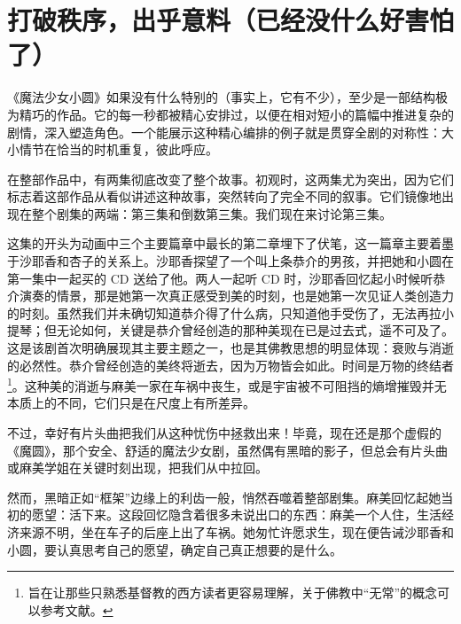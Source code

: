 \chapter[打破秩序，出乎意料（已经没什么好害怕了）]{打破秩序，出乎意料\protect\footnotemark（已经没什么好害怕了）}


《魔法少女小圆》如果没有什么特别的（事实上，它有不少），至少是一部结构极为精巧的作品。它的每一秒都被精心安排过，以便在相对短小的篇幅中推进复杂的剧情，深入塑造角色。一个能展示这种精心编排的例子就是贯穿全剧的对称性：大小情节在恰当的时机重复，彼此呼应。

在整部作品中，有两集彻底改变了整个故事。初观时，这两集尤为突出，因为它们标志着这部作品从看似讲述这种故事，突然转向了完全不同的叙事。它们镜像地出现在整个剧集的两端：第三集和倒数第三集。我们现在来讨论第三集。

这集的开头为动画中三个主要篇章中最长的第二章埋下了伏笔，这一篇章主要着墨于沙耶香和杏子的关系上。沙耶香探望了一个叫上条恭介的男孩，并把她和小圆在第一集中一起买的 CD 送给了他。两人一起听 CD 时，沙耶香回忆起小时候听恭介演奏的情景，那是她第一次真正感受到美的时刻，也是她第一次见证人类创造力的时刻。虽然我们并未确切知道恭介得了什么病，只知道他手受伤了，无法再拉小提琴；但无论如何，关键是恭介曾经创造的那种美现在已是过去式，遥不可及了。这是该剧首次明确展现其主要主题之一，也是其佛教思想的明显体现：衰败与消逝的必然性。恭介曾经创造的美终将逝去，因为万物皆会如此。时间是万物的终结者\footnote{旨在让那些只熟悉基督教的西方读者更容易理解，关于佛教中“无常”的概念可以参考文献\cite{ref25}。}。这种美的消逝与麻美一家在车祸中丧生，或是宇宙被不可阻挡的熵增摧毁并无本质上的不同，它们只是在尺度上有所差异。

不过，幸好有片头曲把我们从这种忧伤中拯救出来！毕竟，现在还是那个虚假的《魔圆》，那个安全、舒适的魔法少女剧，虽然偶有黑暗的影子，但总会有片头曲或麻美学姐在关键时刻出现，把我们从中拉回。

然而，黑暗正如“框架”边缘上的利齿一般，悄然吞噬着整部剧集。麻美回忆起她当初的愿望：活下来。这段回忆隐含着很多未说出口的东西：麻美一个人住，生活经济来源不明，坐在车子的后座上出了车祸。她匆忙许愿求生，现在便告诫沙耶香和小圆，要认真思考自己的愿望，确定自己真正想要的是什么。

